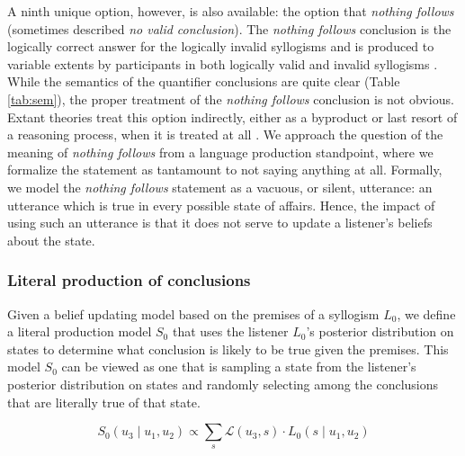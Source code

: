 \documentclass[floatsintext, doc]{apa6}
\begin{document}
A ninth unique option, however, is also available: the option that \emph{nothing follows} (sometimes described \emph{no valid conclusion}). 
The \emph{nothing follows} conclusion is the logically correct answer for the logically invalid syllogisms and is produced to variable extents by participants in both logically valid and invalid syllogisms \cite{Khemlani2012}.
While the semantics of the quantifier conclusions are quite clear (Table \ref{tab:sem}), the proper treatment of the \emph{nothing follows} conclusion is not obvious. 
Extant theories treat this option indirectly, either as a byproduct or last resort of a reasoning process, when it is treated at all \cite{ragni2019does, riesterer2020modeling}.
We approach the question of the meaning of \emph{nothing follows} from a language production standpoint, where we formalize the statement as tantamount to not saying anything at all. 
Formally, we model the \emph{nothing follows} statement as a vacuous, or silent, utterance: an utterance which is true in every possible state of affairs.
Hence, the impact of using such an utterance is that it does not serve to update a listener's beliefs about the state. 


\subsubsection{Literal production of conclusions}

Given a belief updating model based on the premises of a syllogism $L_0$, %
we define a literal production model $S_0$ that uses the listener $L_0$'s posterior distribution on states to determine what conclusion is likely to be true given the premises. 
This model $S_0$ can be viewed as one that is sampling a state from the listener's posterior distribution on states and randomly selecting among the conclusions that are literally true of that state. 


\begin{equation}
S_0(u_3 \mid u_1, u_2) \propto \sum_s \mathcal{L}(u_3, s) \cdot L_0(s \mid u_1, u_2) \label{eq:R0}
\end{equation}
\end{document}
